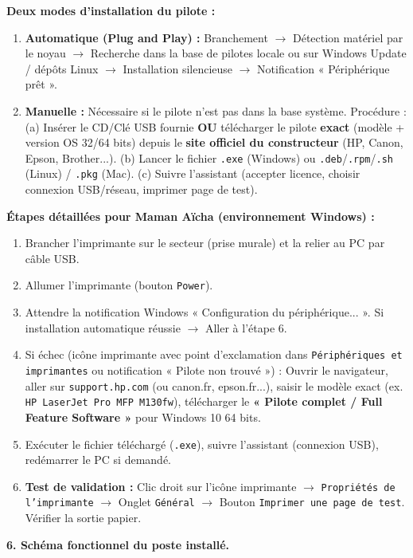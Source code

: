 \documentclass[11pt]{article}
\begin{document}
\begin{exoresolu}
\textbf{Deux modes d'installation du pilote :}
\begin{enumerate}
\item \textbf{Automatique (Plug and Play) :} Branchement $\rightarrow$ Détection matériel par le noyau $\rightarrow$ Recherche dans la base de pilotes locale ou sur Windows Update / dépôts Linux $\rightarrow$ Installation silencieuse $\rightarrow$ Notification « Périphérique prêt ».
\item \textbf{Manuelle :} Nécessaire si le pilote n'est pas dans la base système. Procédure : (a) Insérer le CD/Clé USB fournie \textbf{OU} télécharger le pilote \textbf{exact} (modèle + version OS 32/64 bits) depuis le \textbf{site officiel du constructeur} (HP, Canon, Epson, Brother...). (b) Lancer le fichier \texttt{.exe} (Windows) ou \texttt{.deb}/\texttt{.rpm}/\texttt{.sh} (Linux) / \texttt{.pkg} (Mac). (c) Suivre l'assistant (accepter licence, choisir connexion USB/réseau, imprimer page de test).
\end{enumerate}

\textbf{Étapes détaillées pour Maman Aïcha (environnement Windows) :}
\begin{enumerate}
\item Brancher l'imprimante sur le secteur (prise murale) et la relier au PC par câble USB.
\item Allumer l'imprimante (bouton \texttt{Power}).
\item Attendre la notification Windows « Configuration du périphérique... ». Si installation automatique réussie $\rightarrow$ Aller à l'étape 6.
\item Si échec (icône imprimante avec point d'exclamation dans \texttt{Périphériques et imprimantes} ou notification « Pilote non trouvé ») : Ouvrir le navigateur, aller sur \texttt{support.hp.com} (ou canon.fr, epson.fr...), saisir le modèle exact (ex. \texttt{HP LaserJet Pro MFP M130fw}), télécharger le \textbf{« Pilote complet / Full Feature Software »} pour Windows 10 64 bits.
\item Exécuter le fichier téléchargé (\texttt{.exe}), suivre l'assistant (connexion USB), redémarrer le PC si demandé.
\item \textbf{Test de validation :} Clic droit sur l'icône imprimante $\rightarrow$ \texttt{Propriétés de l'imprimante} $\rightarrow$ Onglet \texttt{Général} $\rightarrow$ Bouton \texttt{Imprimer une page de test}. Vérifier la sortie papier.
\end{enumerate}

\textbf{6. Schéma fonctionnel du poste installé.}


\end{exoresolu}
\end{document}
